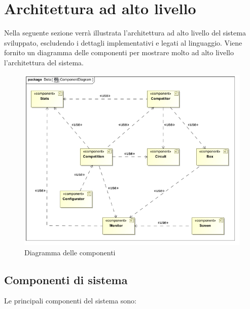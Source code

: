 \section{Architettura ad alto livello}
Nella seguente sezione verr\`{a} illustrata l'architettura ad alto livello del sistema sviluppato, 
escludendo i dettagli implementativi e legati al linguaggio. Viene fornito un diagramma delle componenti per mostrare
molto ad alto livello l'architettura del sistema.\\
\begin{center}
\begin{figure}[h!]
	\includegraphics[scale=0.50]{img/ComponentDiagram.jpg}
	\caption{Diagramma delle componenti}
\end{figure}
\end{center}
\subsection{Componenti di sistema}
Le principali componenti del sistema sono:
